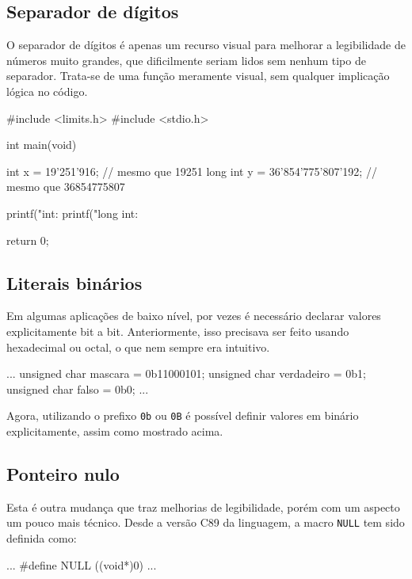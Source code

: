 \subsection{Separador de dígitos}

O separador de dígitos é apenas um recurso visual para melhorar a legibilidade 
de números muito grandes, que dificilmente seriam lidos sem nenhum tipo de 
separador. Trata-se de uma função meramente visual, sem qualquer implicação 
lógica no código.

\begin{excode}
#include <limits.h>
#include <stdio.h>

int main(void)
{
    int x = 19'251'916; // mesmo que 19251
    long int y = 36'854'775'807'192; // mesmo que 36854775807

    printf("int: %
    printf("long int: %

    return 0;
}
\end{excode}

\subsection{Literais binários}

Em algumas aplicações de baixo nível, por vezes é necessário declarar valores 
explicitamente bit a bit. Anteriormente, isso precisava ser feito usando 
hexadecimal ou octal, o que nem sempre era intuitivo.

\begin{excode}
...
unsigned char mascara = 0b11000101;
unsigned char verdadeiro = 0b1;
unsigned char falso = 0b0;
...
\end{excode}

Agora, utilizando o prefixo \texttt{0b} ou \texttt{0B} é possível definir 
valores em binário explicitamente, assim como mostrado acima.

\subsection{Ponteiro nulo}

Esta é outra mudança que traz melhorias de legibilidade, porém com um aspecto 
um pouco mais técnico. Desde a versão C89 da linguagem, a macro \texttt{NULL} 
tem sido definida como:

\begin{excode}
...
\#define NULL ((void*)0)
...
\end{excode}

